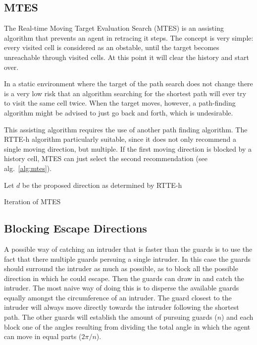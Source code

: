 \documentclass{report}
\begin{document}
		\subsection{MTES}
			The Real-time Moving Target Evaluation Search (MTES) is an assisting algorithm that prevents an agent in retracing it steps. The concept is very simple: every visited cell is considered as an obstable, until the target becomes unreachable through visited cells. At this point it will clear the history and start over.

			In a static environment where the target of the path search does not change there is a very low risk that an algorithm searching for the shortest path will ever try to visit the same cell twice. When the target moves, however, a path-finding algorithm might be advised to just go back and forth, which is undesirable.

			This assisting algorithm requires the use of another path finding algorithm. The RTTE-h algorithm particularly suitable, since it does not only recommend a single moving direction, but multiple. If the first moving direction is blocked by a history cell, MTES can just select the second recommendation (see alg.~\ref{alg:mtes}).

			\begin{algorithm}[H]
				Let $d$ be the proposed direction as determined by RTTE-h\;
				\label{alg:mtes}
				\caption{Iteration of MTES~\protect\cite{undeger2010multi}}
			\end{algorithm}

		\subsection{Blocking Escape Directions}
			A possible way of catching an intruder that is faster than the guards is to use the fact that there multiple guards persuing a single intruder. In this case the guards should surround the intruder as much as possible, as to block all the possible direction in which he could escape. Then the guards can draw in and catch the intruder. The most naive way of doing this is to disperse the available guards equally amongst the circumference of an intruder. The guard closest to the intruder will always move directly towards the intruder following the shortest path. The other guards will establish the amount of pursuing guards ($n$) and each block one of the angles resulting from dividing the total angle in which the agent can move in equal parts ($2\pi / n$).
\end{document}
